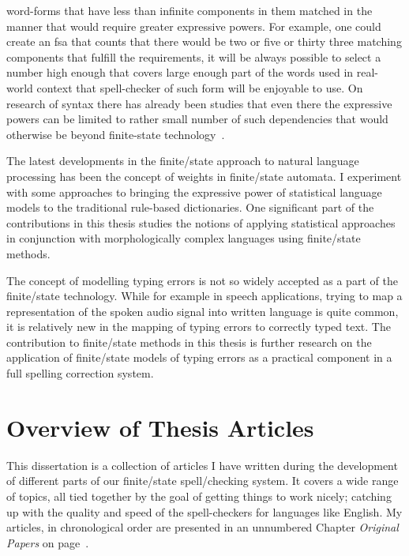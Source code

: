 \documentclass[officiallayout]{unihelcompling}
\begin{document}
word-forms that have less than infinite components in them matched in the
manner that would require greater expressive powers. For example, one could
create an \gls{fsa} that counts that there would be two or five or
thirty three matching components that fulfill the requirements, it will be
always possible to select a number high enough that covers large enough part of
the words used in real-world context that spell-checker of such form will be
enjoyable to use.  On research of syntax there has already been studies that
even there the expressive powers can be limited to rather small number of such
dependencies that would otherwise be beyond finite-state
technology~\citep{karlsson2007constraints}.

The latest developments in the finite\-/state approach to natural language
processing has been the concept of weights in finite\-/state automata.  I
experiment with some approaches to bringing the expressive power of
statistical language models to the traditional rule-based dictionaries. One
significant part of the contributions in this thesis studies the notions of
applying statistical approaches in conjunction with morphologically complex
languages using finite\-/state methods.

The concept of modelling typing errors is not so widely accepted as a part of
the finite\-/state technology. While for example in speech applications, trying
to map a representation of the spoken audio signal into written language is
quite common, it is relatively new in the mapping of typing errors to correctly
typed text. The contribution to finite\-/state methods in this thesis is
further research on the application of finite\-/state models of typing errors
as a practical component in a full spelling correction system.

\section{Overview of Thesis Articles}
\label{sec:articles}

This dissertation is a collection of articles I have written during the
development of different parts of our finite\-/state spell\-/checking system. It
covers a wide range of topics, all tied together by the goal of getting things
to work nicely; catching up with the quality and speed of the spell-checkers
for languages like English. My articles, in chronological order are presented
in an unnumbered Chapter \emph{Original Papers} on page~\pageref{chap:papers}.
\end{document}
